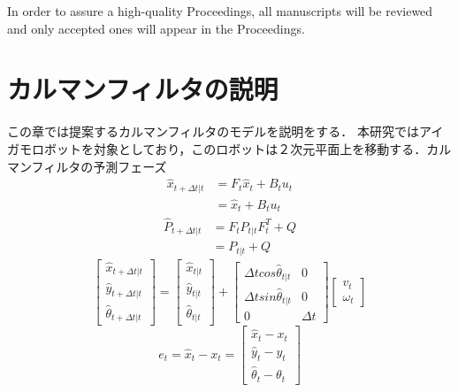 \documentclass[a4paper]{article}
\begin{document}
In order to assure a high-quality Proceedings, all manuscripts will be reviewed and
only accepted ones will appear in the Proceedings.


\section{カルマンフィルタの説明}
この章では提案するカルマンフィルタのモデルを説明をする．
本研究ではアイガモロボットを対象としており，このロボットは２次元平面上を移動する．カルマンフィルタの予測フェーズ
\begin{align}
    \hat{x}_{t+ \Delta t|t} &= F_{t} \hat{x}_{t} + B_{t} u_{t} \nonumber \\
                            &= \hat{x}_{t} + B_{t} u_{t}
    \label{eq:1}
\end{align}
%
%
\begin{align}
    \hat{P}_{t+ \Delta t|t} &= F_{t} P_{t|t} F_{t}^{T} + Q \nonumber \\
                            &= P_{t|t} + Q
    \label{eq:2}
\end{align}
%
%
\begin{equation}
    \begin{bmatrix}
    \hat{x}_{t+ \Delta t|t} \\
    \hat{y}_{t+ \Delta t|t} \\
    \hat{\theta}_{t+ \Delta t|t}
    \end{bmatrix} 
    =
    \begin{bmatrix}
        \hat{x}_{t|t} \\
        \hat{y}_{t|t} \\
        \hat{\theta}_{t|t}
    \end{bmatrix} 
    +
    \begin{bmatrix}
        \Delta t cos\hat{\theta}_{t|t} &0 \\
        \Delta t sin\hat{\theta}_{t|t} &0 \\
        0                              &{\Delta}t
    \end{bmatrix}
    \begin{bmatrix}
        v_{t} \\
        \omega_{t}
    \end{bmatrix}
    \label{eq:3} 
\end{equation}
%
%
\begin{equation}
    e_{t} = \hat{x}_{t} - x_{t} =
    \begin{bmatrix}
        \hat{x}_{t} - x_{t} \\
        \hat{y}_{t} - y_{t} \\
        \hat{\theta}_{t} - \theta_{t}
    \end{bmatrix}
    \label{eq:4}
\end{equation}
%
%
\end{document}
